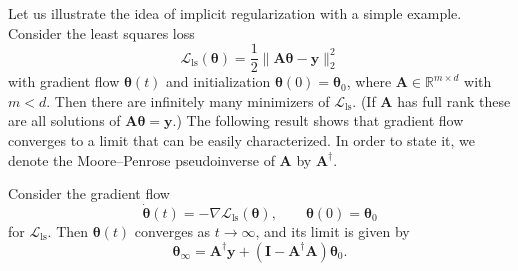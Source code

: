 \documentclass{svproc}
\newcommand{\corr}[1]{#1}
\newcommand{\bA}{\boldsymbol{A}}
\newcommand{\bI}{\boldsymbol{I}}
\newcommand{\bx}{\boldsymbol{x}}
\newcommand{\by}{\boldsymbol{y}}
\newcommand{\btheta}{{\boldsymbol{\theta}}}
\newcommand{\0}{\boldsymbol{0}}
\newcommand{\1}{\boldsymbol{1}}
\def\R{\mathbb{R}}
\def\Lls{\mathcal{L}_\text{ls}}
\begin{document}
Let us illustrate the idea of implicit regularization with a simple example. Consider the least squares loss 
\[
\Lls(\btheta)=\frac{1}{2}\|\bA\btheta-\by\|_2^2
\]
with gradient flow $\btheta(t)$ and initialization $\btheta(0)=\btheta_0$, where $\bA \in \R^{m\times d}$ with $m<d$. 
Then there are infinitely many minimizers of $\Lls$. (If $\bA$ has full rank these are all solutions of 
$\bA \btheta = \by$.)
The following \corr{result} shows that gradient flow 
converges to a limit that can be easily characterized.
In order to state \corr{it,} we denote the Moore--Penrose \corr{pseudoinverse} of $\bA$ by $\bA^\dagger$.
\begin{proposition}
Consider the gradient flow
\begin{equation}\label{eq:lsq_pseudo}
    \dot{\btheta}(t)=-\nabla\Lls(\btheta), \qquad \btheta(0)=\btheta_0
\end{equation}
for $\Lls$.
Then $\btheta(t)$ converges as $t\to\infty$, and its limit is given by
\begin{equation*}
    \btheta_\infty=\bA^\dagger\by+(\bI-\bA^\dagger\bA)\btheta_0.
\end{equation*}
\end{proposition}
\end{document}
